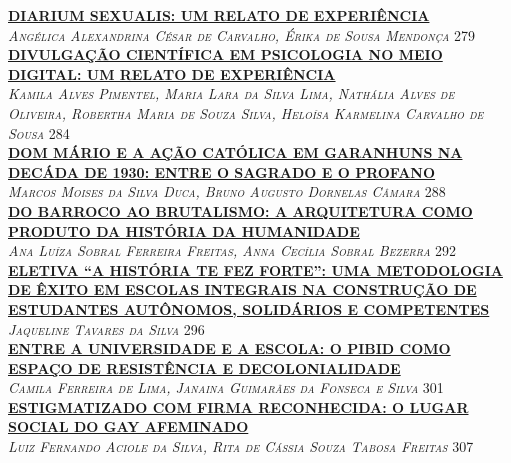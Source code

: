 \noindent \textsc{\hyperlink{trabalhos/249486.pdf.1}{\textbf{DIARIUM SEXUALIS: UM RELATO DE EXPERIÊNCIA}}}\\ 
\noindent \textsc{\textit{Angélica Alexandrina César de Carvalho, Érika de Sousa Mendonça}} \hfill 279\\ 

\noindent \textsc{\hyperlink{trabalhos/249155.pdf.1}{\textbf{DIVULGAÇÃO CIENTÍFICA EM PSICOLOGIA NO MEIO DIGITAL: UM RELATO DE EXPERIÊNCIA}}}\\ 
\noindent \textsc{\textit{Kamila Alves Pimentel, Maria Lara da Silva Lima, Nathália Alves de Oliveira, Robertha Maria de Souza Silva, Heloísa Karmelina Carvalho de Sousa}} \hfill 284\\ 

\noindent \textsc{\hyperlink{trabalhos/250072.pdf.1}{\textbf{DOM MÁRIO E A AÇÃO CATÓLICA EM GARANHUNS NA DECÁDA DE 1930: ENTRE O SAGRADO E O PROFANO}}}\\ 
\noindent \textsc{\textit{Marcos Moises da Silva Duca, Bruno Augusto Dornelas Câmara}} \hfill 288\\ 

\noindent \textsc{\hyperlink{trabalhos/250111.pdf.1}{\textbf{DO BARROCO AO BRUTALISMO: A ARQUITETURA COMO PRODUTO DA HISTÓRIA DA HUMANIDADE}}}\\ 
\noindent \textsc{\textit{Ana Luíza Sobral Ferreira Freitas, Anna Cecília Sobral Bezerra}} \hfill 292\\ 

\noindent \textsc{\hyperlink{trabalhos/251448.pdf.1}{\textbf{ELETIVA “A HISTÓRIA TE FEZ FORTE”: UMA METODOLOGIA DE ÊXITO EM ESCOLAS INTEGRAIS NA CONSTRUÇÃO DE ESTUDANTES AUTÔNOMOS, SOLIDÁRIOS E COMPETENTES }}}\\ 
\noindent \textsc{\textit{Jaqueline Tavares da Silva}} \hfill 296\\ 

\noindent \textsc{\hyperlink{trabalhos/251561.pdf.1}{\textbf{ENTRE A UNIVERSIDADE E A ESCOLA: O PIBID COMO ESPAÇO DE RESISTÊNCIA E DECOLONIALIDADE}}}\\ 
\noindent \textsc{\textit{Camila Ferreira de Lima, Janaina Guimarães da Fonseca e Silva}} \hfill 301\\ 

\noindent \textsc{\hyperlink{trabalhos/250351.pdf.1}{\textbf{ESTIGMATIZADO COM FIRMA RECONHECIDA: O LUGAR SOCIAL DO GAY AFEMINADO}}}\\ 
\noindent \textsc{\textit{Luiz Fernando Aciole da Silva, Rita de Cássia Souza Tabosa Freitas}} \hfill 307\\ 

